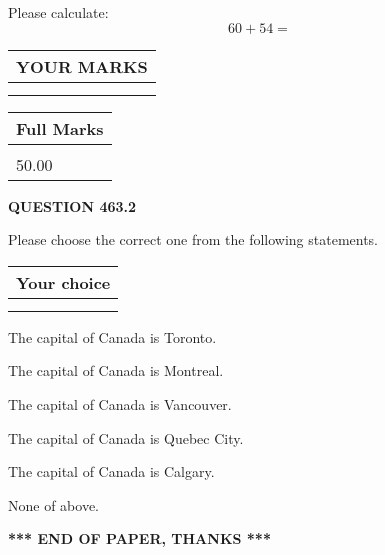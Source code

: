 \documentclass[12pt]{article}
\begin{document}
  
 
Please calculate:
\begin{equation}
60 +  %
54 = \nonumber
\end{equation}
 

 

 
  
\vspace{0.2in}
  
\noindent\begin{tabular}{|l|}
\hline
 YOUR MARKS  \\
\hline
 \\ 
 \\ 
\hline
\end{tabular}
\hspace{0.05in} \begin{tabular}{|l|}
\hline
 Full Marks  \\
\hline
 \\ 
50.00 \\
\hline
\end{tabular}
{\textbf{\Large{QUESTION
463.2 
}}}
  
  
Please choose the correct one from the following statements.
  
  
\noindent\hspace{3.0in} \begin{tabular}{|l|}
\hline
Your choice \\
\hline
 \\ 
 \\ 
\hline
\end{tabular}
  
  
 
 
The capital of Canada is Toronto.
 
 
The capital of Canada is Montreal.
 
 
The capital of Canada is Vancouver.
 
 
The capital of Canada is Quebec City.
 
 
The capital of Canada is Calgary.
 
 
 None of above.
 
 
   
   
 \vspace{0.2in}
 
   
   
   
   
\vspace{1.0in} 
{\textbf{\large{ *** END OF PAPER, THANKS *** }}} 
   
\end{document}
